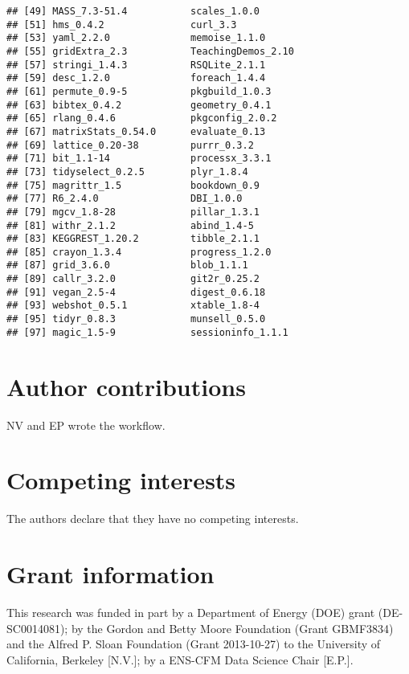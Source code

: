 \documentclass[9pt,a4paper,]{extarticle}
\begin{document}
\begin{verbatim}
## [49] MASS_7.3-51.4           scales_1.0.0           
## [51] hms_0.4.2               curl_3.3               
## [53] yaml_2.2.0              memoise_1.1.0          
## [55] gridExtra_2.3           TeachingDemos_2.10     
## [57] stringi_1.4.3           RSQLite_2.1.1          
## [59] desc_1.2.0              foreach_1.4.4          
## [61] permute_0.9-5           pkgbuild_1.0.3         
## [63] bibtex_0.4.2            geometry_0.4.1         
## [65] rlang_0.4.6             pkgconfig_2.0.2        
## [67] matrixStats_0.54.0      evaluate_0.13          
## [69] lattice_0.20-38         purrr_0.3.2            
## [71] bit_1.1-14              processx_3.3.1         
## [73] tidyselect_0.2.5        plyr_1.8.4             
## [75] magrittr_1.5            bookdown_0.9           
## [77] R6_2.4.0                DBI_1.0.0              
## [79] mgcv_1.8-28             pillar_1.3.1           
## [81] withr_2.1.2             abind_1.4-5            
## [83] KEGGREST_1.20.2         tibble_2.1.1           
## [85] crayon_1.3.4            progress_1.2.0         
## [87] grid_3.6.0              blob_1.1.1             
## [89] callr_3.2.0             git2r_0.25.2           
## [91] vegan_2.5-4             digest_0.6.18          
## [93] webshot_0.5.1           xtable_1.8-4           
## [95] tidyr_0.8.3             munsell_0.5.0          
## [97] magic_1.5-9             sessioninfo_1.1.1
\end{verbatim}

\hypertarget{author-contributions}{%
\section{Author contributions}\label{author-contributions}}

NV and EP wrote the workflow.

\hypertarget{competing-interests}{%
\section{Competing interests}\label{competing-interests}}

The authors declare that they have no competing interests.

\hypertarget{grant-information}{%
\section{Grant information}\label{grant-information}}

This research was funded in part by a Department of Energy (DOE) grant
(DE-SC0014081); by the Gordon and Betty Moore Foundation (Grant GBMF3834) and
the Alfred P. Sloan Foundation (Grant 2013-10-27) to the University of
California, Berkeley {[}N.V.{]}; by a ENS-CFM Data Science Chair {[}E.P.{]}.
\end{document}
